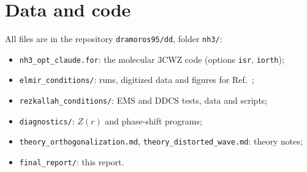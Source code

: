 \documentclass[11pt,a4paper]{article}
\begin{document}
\section{Data and code}
All files are in the repository \texttt{dramoros95/dd}, folder \texttt{nh3/}:
\begin{itemize}
\item \texttt{nh3\_opt\_claude.for}: the molecular 3CWZ code (options \texttt{isr}, \texttt{iorth});
\item \texttt{elmir\_conditions/}: runs, digitized data and figures for Ref.~\cite{ElMir2020};
\item \texttt{rezkallah\_conditions/}: EMS and DDCS tests, data and scripts;
\item \texttt{diagnostics/}: $Z(r)$ and phase-shift programs;
\item \texttt{theory\_orthogonalization.md}, \texttt{theory\_distorted\_wave.md}: theory notes;
\item \texttt{final\_report/}: this report.
\end{itemize}
\end{document}
